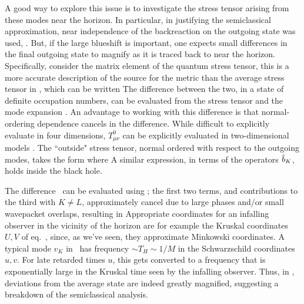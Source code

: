 A good way to explore this issue is to investigate the stress tensor arising from these modes near the horizon.  In particular, in justifying the semiclassical approximation, near independence of the backreaction on the outgoing state was used, \approxgrav.  But, if the large blueshift is important, one expects small differences in the final outgoing state to magnify as it is traced back to near the horizon.  Specifically, consider the matrix element of the quantum stress tensor,
%
\eqn{}
%
this is a more accurate description of the source for the metric than the average stress tensor in \classmet, which can be written
%
\eqn{}
%
The difference between the two, in a state of definite occupation numbers,
%
\eqn{}
%
can be evaluated from the stress tensor
%
\eqn{}
%
and the mode expansion \modedecomp.  An advantage to working with this difference is that normal-ordering dependence cancels in the difference.  While difficult to explicitly evaluate in four dimensions, $T^0_{\mu\nu}$ can be explicitly evaluated in two-dimensional models .
The ``outside" stress tensor, normal ordered with respect to the outgoing modes, takes the form
%
\eqn{}
%
where
%
\eqn{}
%
A similar expression, in terms of the operators ${\hat b}_K$, holds inside the black hole.

The difference \tdiffer\ can be evaluated using \fdstexp; the first two terms, and contributions to the third with $K\neq L$, approximately cancel due to large phases and/or small wavepacket overlaps, resulting in
%
\eqn{}
%
Appropriate coordinates for an infalling observer in the vicinity of the horizon are for example the Kruskal coordinates $U,V$ of eq.~\kruskdef, since, as we've seen,  they approximate Minkowski coordinates.  A typical mode $v_K$ in \fdT\ has frequency $\sim T_H\sim 1/M$ in the Schwarzschild coordinates $u,v$.  For late retarded times $u$, this gets converted to a frequency that is exponentially large in the Kruskal time seen by the infalling observer. Thus, in \fdT, deviations from the average state are indeed greatly magnified, suggesting a breakdown of the semiclassical analysis.


